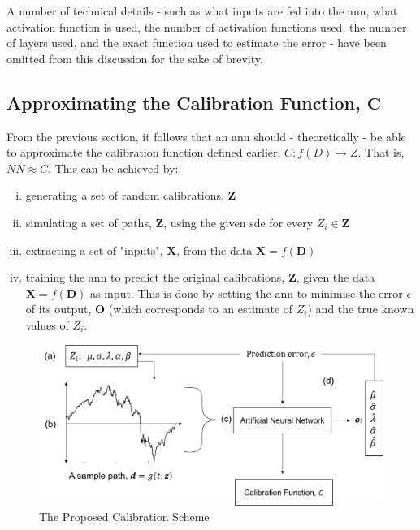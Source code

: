 \documentclass[11pt,oneside,openany,a4paper,english, report, goldenblock
]{usthesis}
\begin{document}
A number of technical details - such as what inputs are fed into the \acrshort{ann}, what activation function is used, the number of activation functions used, the number of layers used, and the exact function used to estimate the error - have been omitted from this discussion for the sake of brevity. 

\subsection{Approximating the Calibration Function, $\mathbf{C}$} \label{subsection:neural_networks:approximating_the_calibration_function_C}
From the previous section, it follows that an \acrshort{ann} should - theoretically - be able to approximate the calibration function defined earlier, $C: f \left( D \right) \rightarrow Z$. That is, $NN \approx C$.
This can be achieved by:
\begin{enumerate}[i)]
	\itemsep0em 
	
	\item generating a set of random calibrations, $\mathbf{Z}$
	
	\item simulating a set of paths,  $\mathbf{Z}$, using the given \acrshort{sde} for every  $Z_i \in \mathbf{Z}$
	
	\item extracting a set of "inputs", $\mathbf{X}$, from the data $\mathbf{X} = f\left(\mathbf{D}\right)$
	
	\item training the \acrshort{ann} to predict the original calibrations, $\mathbf{Z}$, given the data $\mathbf{X}=f \left( \mathbf{D} \right)$ as input. This is done by setting the \acrshort{ann} to minimise the error $\epsilon$ of its output, $\mathbf{O}$ (which corresponds to an estimate of $Z_i$) and the true known values of $Z_i$.
	
	
\end{enumerate}

\begin{figure}[h]
	\centering
	\includegraphics[width=1\linewidth]{Images/Diagrams/CalibrationSchemeDiagram}
	\caption[The Proposed Calibration Scheme]{The Proposed Calibration Scheme}
	\label{fig:calibrationschemediagram}
\end{figure}
\end{document}
